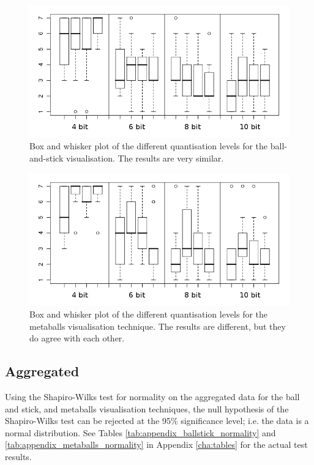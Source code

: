 \begin{figure}
  \begin{center}
    \includegraphics[width=120mm]{boxwhisker_dataset_ballstick}
  \end{center}
  \caption{Box and whisker plot of the different quantisation levels for the
  ball-and-stick visualisation. The results are very similar.}
  \label{fig:results_boxwhisker_dataset_ballstick}
\end{figure}

\begin{figure}
  \begin{center}
    \includegraphics[width=120mm]{boxwhisker_dataset_metaballs}
  \end{center}
  \caption{Box and whisker plot of the different quantisation levels for the
  metaballs visualisation technique. The results are different, but they do
  agree with each other.}
  \label{fig:results_boxwhisker_dataset_metaballs}
\end{figure}


\subsection*{Aggregated}
\label{sub:results_results_aggregated}

Using the Shapiro-Wilks test for normality on the aggregated data for the ball
and stick, and metaballs visualisation techniques, the null hypothesis of the
Shapiro-Wilks test can be rejected at the 95\% significance level; i.e. the
data is a normal distribution. See Tables
\ref{tab:appendix_ballstick_normality} and
\ref{tab:appendix_metaballs_normality} in Appendix \ref{cha:tables} for the
actual test results.

